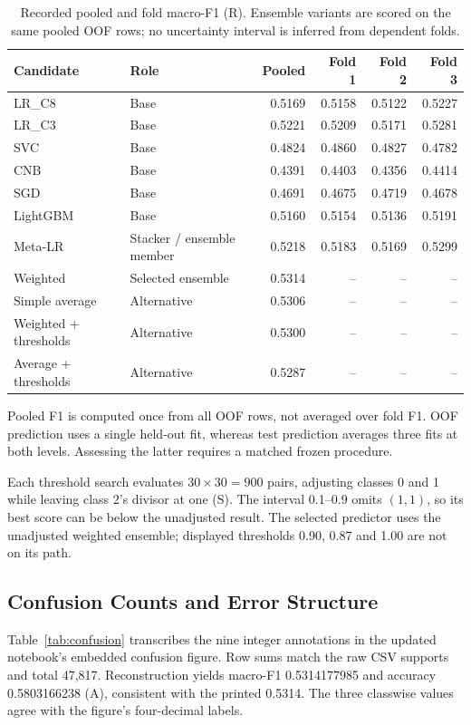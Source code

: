 \documentclass[doublecolumn]{ijcvsplatex}
\begin{document}
\begin{table}[t]
\small\centering
\caption{Recorded pooled and fold macro-F1 (R). Ensemble variants are scored on the same pooled OOF rows; no uncertainty interval is inferred from dependent folds.}
\label{tab:results}
\begin{tabular}{llrrrr}
\toprule
Candidate & Role & Pooled & Fold 1 & Fold 2 & Fold 3 \\
\midrule
LR\_C8 & Base & 0.5169 & 0.5158 & 0.5122 & 0.5227 \\
LR\_C3 & Base & 0.5221 & 0.5209 & 0.5171 & 0.5281 \\
SVC & Base & 0.4824 & 0.4860 & 0.4827 & 0.4782 \\
CNB & Base & 0.4391 & 0.4403 & 0.4356 & 0.4414 \\
SGD & Base & 0.4691 & 0.4675 & 0.4719 & 0.4678 \\
LightGBM & Base & 0.5160 & 0.5154 & 0.5136 & 0.5191 \\
Meta-LR & Stacker / ensemble member & 0.5218 & 0.5183 & 0.5169 & 0.5299 \\
\midrule
Weighted & Selected ensemble & 0.5314 & -- & -- & -- \\
Simple average & Alternative & 0.5306 & -- & -- & -- \\
Weighted + thresholds & Alternative & 0.5300 & -- & -- & -- \\
Average + thresholds & Alternative & 0.5287 & -- & -- & -- \\
\bottomrule
\end{tabular}
\end{table}

Pooled F1 is computed once from all OOF rows, not averaged over fold F1. OOF prediction uses a single held-out fit, whereas test prediction averages three fits at both levels. Assessing the latter requires a matched frozen procedure.

Each threshold search evaluates $30\times30=900$ pairs, adjusting classes 0 and 1 while leaving class 2's divisor at one (S). The interval 0.1--0.9 omits $(1,1)$, so its best score can be below the unadjusted result. The selected predictor uses the unadjusted weighted ensemble; displayed thresholds 0.90, 0.87 and 1.00 are not on its path.

\subsection{Confusion Counts and Error Structure}
Table~\ref{tab:confusion} transcribes the nine integer annotations in the updated notebook's embedded confusion figure. Row sums match the raw CSV supports and total 47,817. Reconstruction yields macro-F1 0.5314177985 and accuracy 0.5803166238 (A), consistent with the printed 0.5314. The three classwise values agree with the figure's four-decimal labels.
\end{document}
